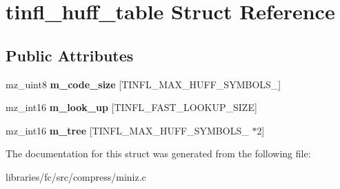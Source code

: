\hypertarget{structtinfl__huff__table}{}\section{tinfl\+\_\+huff\+\_\+table Struct Reference}
\label{structtinfl__huff__table}
\subsection*{Public Attributes}
\begin{DoxyCompactItemize}
\item 
\mbox{\label{structtinfl__huff__table_a31f719d4829db3d6646139d5249094cb}} 
mz\+\_\+uint8 {\bfseries m\+\_\+code\+\_\+size} \mbox{[}T\+I\+N\+F\+L\+\_\+\+M\+A\+X\+\_\+\+H\+U\+F\+F\+\_\+\+S\+Y\+M\+B\+O\+L\+S\+\_\mbox{]}
\item 
\mbox{\label{structtinfl__huff__table_a51b707504c86547f166bc557d7ce4f84}} 
mz\+\_\+int16 {\bfseries m\+\_\+look\+\_\+up} \mbox{[}T\+I\+N\+F\+L\+\_\+\+F\+A\+S\+T\+\_\+\+L\+O\+O\+K\+U\+P\+\_\+\+S\+I\+ZE\mbox{]}
\item 
\mbox{\label{structtinfl__huff__table_a1208fe7e128f00188f99ba6f51fa9af6}} 
mz\+\_\+int16 {\bfseries m\+\_\+tree} \mbox{[}T\+I\+N\+F\+L\+\_\+\+M\+A\+X\+\_\+\+H\+U\+F\+F\+\_\+\+S\+Y\+M\+B\+O\+L\+S\+\_ $\ast$2\mbox{]}
\end{DoxyCompactItemize}


The documentation for this struct was generated from the following file\+:\begin{DoxyCompactItemize}
\item 
libraries/fc/src/compress/miniz.\+c\end{DoxyCompactItemize}
